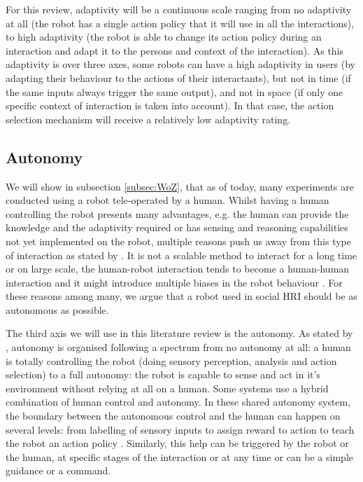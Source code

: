     For this review, adaptivity will be a continuous scale ranging from no
    adaptivity at all (the robot has a single action policy that it will use in
    all the interactions), to high adaptivity (the robot is able to change its
    action policy during an interaction and adapt it to the persons and context
    of the interaction). As this adaptivity is over three axes, some robots can
    have a high adaptivity in users (by adapting their behaviour to the actions
    of their interactants), but not in time (if the same inputs always trigger
    the same output), and not in space (if only one specific context of
    interaction is taken into account). In that case, the action selection
    mechanism will receive a relatively low adaptivity rating.

\subsection{Autonomy}
	
    We will show in subsection \ref{subsec:WoZ}, that as of today, many
    experiments are conducted using a robot tele-operated by a human. Whilst
    having a human controlling the robot presents many advantages, e.g. the
    human can provide the knowledge and the adaptivity required or has sensing
    and reasoning capabilities not yet implemented on the robot, multiple
    reasons push us away from this type of interaction as stated by
    \citet{Thill2013}. It is not a scalable method to interact for a long time
    or on large scale, the human-robot interaction tends to become a human-human
    interaction \citep{baxter2016characterising} and it might introduce multiple
    biases in the robot behaviour \citep{howley2014effects}. For these reasons
    among many, we argue that a robot used in social HRI should be as autonomous
    as possible.
	
    The third axis we will use in this literature review is the autonomy. As
    stated by 	 \citet{beer2014toward}, autonomy is organised following a
    spectrum from no autonomy at all: a human is totally controlling the robot
    (doing sensory perception, analysis and action selection) to a full
    autonomy: the robot is capable to sense and act in it's environment without
    relying at all on a human. Some systems use a hybrid combination of human
    control and autonomy. In these shared autonomy system, the boundary between
    the autonomous control and the human can happen on several levels: from
    labelling of sensory inputs \citep{depalma2016nimbus} to assign reward to
    action to teach the robot an action policy \citep{thomaz2008teachable}.
    Similarly, this help can be triggered by the robot or the human, at specific
    stages of the interaction or at any time or can be a simple guidance or a
    command. 

